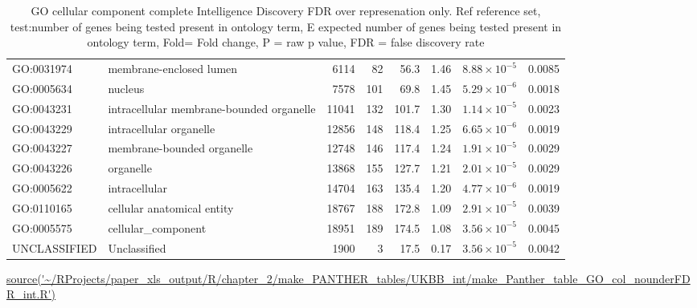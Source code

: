 \begin{table}[ht]
\begin{adjustbox}{width=\textwidth}
\begin{tabular}{llrrrrrr}
  GO:0031974 & membrane-enclosed lumen  & 6114 & 82 & 56.3 & 1.46 & $8.88 \times 10^{-5}$ & 0.0085 \\ 
  GO:0005634 & nucleus  & 7578 & 101 & 69.8 & 1.45 & $5.29 \times 10^{-6}$ & 0.0018 \\ 
  GO:0043231 & intracellular membrane-bounded organelle  & 11041 & 132 & 101.7 & 1.30 & $1.14 \times 10^{-5}$ & 0.0023 \\ 
  GO:0043229 & intracellular organelle  & 12856 & 148 & 118.4 & 1.25 & $6.65 \times 10^{-6}$ & 0.0019 \\ 
  GO:0043227 & membrane-bounded organelle  & 12748 & 146 & 117.4 & 1.24 & $1.91 \times 10^{-5}$ & 0.0029 \\ 
  GO:0043226 & organelle  & 13868 & 155 & 127.7 & 1.21 & $2.01 \times 10^{-5}$ & 0.0029 \\ 
  GO:0005622 & intracellular  & 14704 & 163 & 135.4 & 1.20 & $4.77 \times 10^{-6}$ & 0.0019 \\ 
  GO:0110165 & cellular anatomical entity  & 18767 & 188 & 172.8 & 1.09 & $2.91 \times 10^{-5}$ & 0.0039 \\ 
  GO:0005575 & cellular\_component  & 18951 & 189 & 174.5 & 1.08 & $3.56 \times 10^{-5}$ & 0.0045 \\ 
  UNCLASSIFIED & Unclassified  & 1900 & 3 & 17.5 & 0.17 & $3.56 \times 10^{-5}$ & 0.0042 \\ 
   \bottomrule
\end{tabular}
\end{adjustbox}
    \caption[GO enrichment cellular component Intelligence Discovery]{GO cellular component complete Intelligence Discovery FDR over represenation only.  Ref reference set, test:number of genes being tested present in ontology term, E expected number of genes being tested present in ontology term, Fold= Fold change, P = raw p value, FDR = false discovery rate}
    \tiny\url{source('~/RProjects/paper_xls_output/R/chapter_2/make_PANTHER_tables/UKBB_int/make_Panther_table_GO_col_nounderFDR_int.R')}
\label{tab:GO cellular component complete Intelligence Discovery FDRover represenation only}
\end{table}

